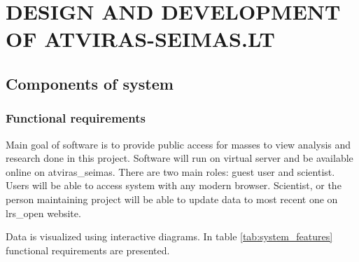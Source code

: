 \documentclass[a4paper,12pt]{article}
\begin{document}
	
	\clearpage
	
	
	
	\clearpage
	
	\section{DESIGN AND DEVELOPMENT OF ATVIRAS-SEIMAS.LT}
	\subsection{Components of system}
	\subsubsection{Functional requirements}
	
	Main goal of software is to provide public access for masses to view analysis and research done in this project. Software will run on virtual server and be available online on \gls{atviras_seimas}. There are two main roles: guest user and scientist. Users will be able to access system with any modern browser. Scientist, or the person maintaining project will be able to update data to most recent one on \gls{lrs_open} website.
	
	
	Data is visualized using interactive diagrams. In table \ref{tab:system_features} functional requirements are presented.
	
\end{document}

